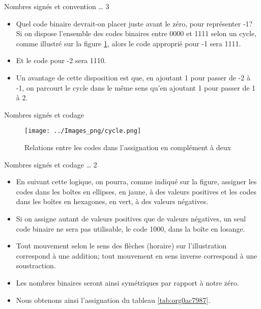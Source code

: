 \documentclass[presentation]{beamer}
\begin{document}
\begin{frame}[label={sec:org8f44b79}]{Nombres signés et convention \ldots{} 3}
\begin{itemize}
\item Quel code binaire devrait-on placer juste avant le zéro, pour représenter -1? Si on dispose l'ensemble des codes binaires entre 0000 et 1111 selon un cycle, comme illustré sur la figure \ref{fig:org9946072}, alors le code approprié pour -1 sera 1111.

\item Et le code pour -2 sera 1110.

\item Un avantage de cette disposition est que, en ajoutant 1 pour passer de -2 à -1, on parcourt le cycle dans le même sens qu'en ajoutant 1 pour passer de 1 à 2.
\end{itemize}
\end{frame}

\begin{frame}[label={sec:orgd065d6b}]{Nombres signés et codage}
\begin{figure}[htbp]
\centering
\texttt{[image: ../Images\_png/cycle.png]}
\caption{\label{fig:org9946072}Relations entre les codes dans l'assignation en complément à deux}
\end{figure}
\end{frame}

\begin{frame}[label={sec:orgfaabb1a}]{Nombres signés et codage \ldots{} 2}
\begin{itemize}
\item En suivant cette logique, on pourra, comme indiqué sur la figure, assigner les codes dans les boîtes en ellipses, en jaune, à des valeurs positives et les codes dans les boîtes en hexagones, en vert, à des valeurs négatives.

\item Si on assigne autant de valeurs positives que de valeurs négatives, un seul code binaire ne sera pas utilisable, le code 1000, dans la boîte en losange.

\item Tout mouvement selon le sens des flèches (horaire) sur l'illustration correspond à une addition; tout mouvement en sens inverse correspond à une soustraction.

\item Les nombres binaires seront ainsi symétriques par rapport à notre zéro.

\item Nous obtenons ainsi l'assignation du tableau \ref{tab:org0ac7987}.
\end{itemize}
\end{frame}
\end{document}
